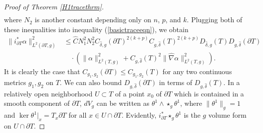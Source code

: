 \documentclass[10pt,a4paper]{amsart}
\begin{document}
\begin{proof}[Proof of Theorem \ref{H1tracethrm}]
\begin{align*}
\end{align*}
where $N_2$ is another constant depending only on $n$, $p$, and $k$.
Plugging both of these inequalities into inequality (\ref{basictraceeqn}), we obtain
\begin{equation}\label{H1traceintermediate1}
\begin{split}
\|i_{\partial T}^*\alpha\|^2_{L^2(\partial T, g)} &\le \hat C N_1^2N_2^2C_{\hat \delta,g}(\partial T)^{2(k+p)}C_{g,\hat \delta}(T)^{2(k+p)}D_{\hat \delta,g}(T)D_{g,\hat \delta}(\partial T) \\ &\quad\cdot \left(\|\alpha\|_{L^2(T,g)}^2 + C_{g,\hat \delta}(T)^2\|\hat\nabla\alpha\|_{L^2(T,g)}^2\right).
\end{split}
\end{equation}
It is clearly the case that $C_{g_1,g_2}(\partial T) \le C_{g_1,g_2}(T)$ for any two continuous metrics $g_1, g_2$ on $T$. We can also bound $D_{g,\hat \delta}(\partial T)$ in terms of $D_{g,\hat \delta}(T)$. In a relatively open neighborhood $U \subset T$ of a point $x_0$ of $\partial T$ which is contained in a smooth component of $\partial T$, $dV_{g}$ can be written as $\theta^1\wedge\star_g\theta^1$, where $\|\theta^1\|_g = 1$ and $\ker \theta^1|_x = T_x\partial T$ for all $x \in U \cap \partial T$. Evidently, $i_{\partial T}^*\star_g \theta^1$ is the $g$ volume form on $U \cap \partial T$.


\end{proof}
\end{document}
